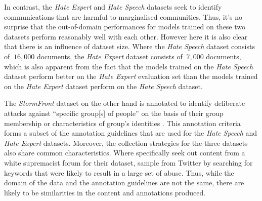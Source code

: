 In contrast, the \textit{Hate Expert} and \textit{Hate Speech} datasets seek to identify communications that are harmful to marginalised communities. 
Thus, it's no surprise that the out-of-domain performances for models trained on these two datasets perform reasonably well with each other. 
However here it is also clear that there is an influence of dataset size. 
Where the \textit{Hate Speech} dataset consists of $~16,000$ documents, the \textit{Hate Expert} dataset consists of $~7,000$ documents, which is also apparent from the fact that the models trained on the \textit{Hate Speech} dataset perform better on the \textit{Hate Expert} evaluation set than the models trained on the \textit{Hate Expert} dataset perform on the \textit{Hate Speech} dataset.

The \textit{StormFront} dataset on the other hand is annotated to identify deliberate attacks against ``specific group[s] of people'' on the basis of their group membership or characteristics of group's identities \citep{Garcia:2019}. 
This annotation criteria forms a subset of the annotation guidelines that are used for the \textit{Hate Speech} and \textit{Hate Expert} datasets. 
Moreover, the collection strategies for the three datasets also share common characteristics. 
Where \citet{Garcia:2019} specifically seek out content from a white supremacist forum for their dataset, \citet{Waseem:2016,Waseem-Hovy:2016} sample from Twitter by searching for keywords that were likely to result in a large set of abuse. 
Thus, while the domain of the data and the annotation guidelines are not the same, there are likely to be similarities in the content and annotations produced.

